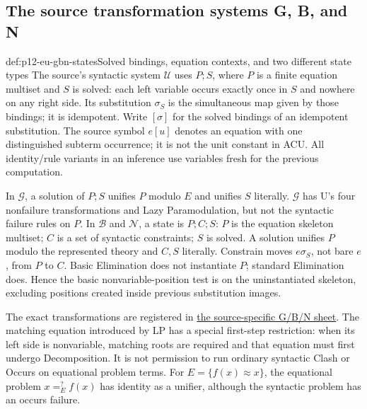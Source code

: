 \subsection{The source transformation systems G, B, and N}

\begin{hbdefinition}{def:p12-eu-gbn-states}{Solved bindings, equation contexts, and two different state types}
The source's syntactic system \(\mathcal U\) uses \(P;S\), where \(P\) is
a finite equation multiset and \(S\) is solved: each left variable
occurs exactly once in \(S\) and nowhere on any right side. Its
substitution \(\sigma_S\) is the simultaneous map given by those
bindings; it is idempotent. Write \([\sigma]\) for the solved bindings
of an idempotent substitution. The source symbol \(e[u]\) denotes
an equation with one distinguished subterm occurrence; it is not the
unit constant in ACU. All identity/rule variants in an inference use
variables fresh for the previous computation.

In \(\mathcal G\), a solution of \(P;S\) unifies \(P\) modulo \(E\)
and unifies \(S\) literally. \(\mathcal G\) has U's four nonfailure
transformations and Lazy Paramodulation, but not the syntactic failure
rules on \(P\). In \(\mathcal B\) and \(\mathcal N\), a state is \(P;C;S\):
\(P\) is the equation skeleton multiset; \(C\) is a set of
syntactic constraints; \(S\) is solved. A solution unifies \(P\)
modulo the represented theory and \(C,S\) literally. Constrain moves
\(e\sigma_S\), not bare \(e\), from \(P\) to \(C\).
Basic Elimination does not instantiate \(P\); standard Elimination
does. Hence the basic nonvariable-position test is on the uninstantiated
skeleton, excluding positions created inside previous substitution images.
\cite[\S2.2.3, Definition 4.1, \S4.3, pp.~454--455,488,495--499]{BaaderSnyder2001}
\end{hbdefinition}

The exact transformations are registered in
\hyperref[sheet:p12-equational-unification-narrowing]{the source-specific
G/B/N sheet}. The matching equation introduced by LP has a special
first-step restriction: when its left side is nonvariable, matching
roots are required and that equation must first undergo Decomposition.
It is not permission to run ordinary syntactic Clash or Occurs on
equational problem terms. For \(E=\{f(x)\approx x\}\), the
equational problem \(x=^{?}_E f(x)\) has identity as a unifier,
although the syntactic problem has an occurs failure.



